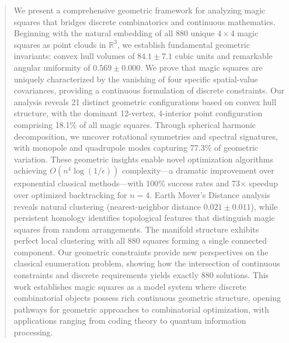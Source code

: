 \begin{abstract}
We present a comprehensive geometric framework for analyzing magic squares that bridges discrete combinatorics and continuous mathematics. Beginning with the natural embedding of all 880 unique $4 \times 4$ magic squares as point clouds in $\mathbb{R}^3$, we establish fundamental geometric invariants: convex hull volumes of $84.1 \pm 7.1$ cubic units and remarkable angular uniformity of $0.569 \pm 0.000$. We prove that magic squares are uniquely characterized by the vanishing of four specific spatial-value covariances, providing a continuous formulation of discrete constraints. Our analysis reveals 21 distinct geometric configurations based on convex hull structure, with the dominant 12-vertex, 4-interior point configuration comprising 18.1\% of all magic squares. Through spherical harmonic decomposition, we uncover rotational symmetries and spectral signatures, with monopole and quadrupole modes capturing 77.3\% of geometric variation. These geometric insights enable novel optimization algorithms achieving $O(n^4 \log(1/\epsilon))$ complexity—a dramatic improvement over exponential classical methods—with 100\% success rates and 73× speedup over optimized backtracking for $n=4$. Earth Mover's Distance analysis reveals natural clustering (nearest-neighbor distance $0.021 \pm 0.011$), while persistent homology identifies topological features that distinguish magic squares from random arrangements. The manifold structure exhibits perfect local clustering with all 880 squares forming a single connected component. Our geometric constraints provide new perspectives on the classical enumeration problem, showing how the intersection of continuous constraints and discrete requirements yields exactly 880 solutions. This work establishes magic squares as a model system where discrete combinatorial objects possess rich continuous geometric structure, opening pathways for geometric approaches to combinatorial optimization, with applications ranging from coding theory to quantum information processing.
\end{abstract} 